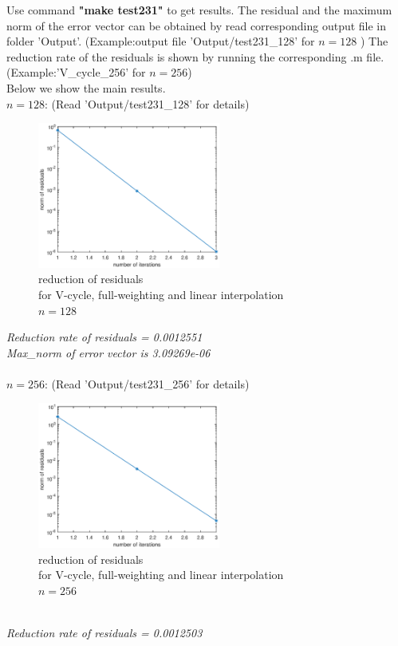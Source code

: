 \documentclass[a4paper,twocolumn]{article}
\theoremstyle{definition}
\begin{document}
Use command \textbf{"make test231"} to get results. The residual and the maximum norm of the error vector can be obtained by read corresponding output file in folder 'Output'. (Example:output file 'Output/test231\_128' for $n = 128$ ) The reduction rate of the residuals is shown by running the corresponding .m file. (Example:'V\_cycle\_256' for $n = 256$)\\
Below we show the main results.\\
$n=128$: (Read 'Output/test231\_128' for details)
\begin{figure}[!htp]   
	\centering
	\includegraphics[width=6cm]{Pictures/F231_1.eps}
	\caption{reduction of residuals \\for V-cycle, full-weighting and linear interpolation\\ $n = 128$}
\end{figure}
\newpage
\noindent \emph{Reduction rate of residuals = 0.0012551}\\
\emph{Max\_norm of error vector is 3.09269e-06}\\\\
$n=256$: (Read 'Output/test231\_256' for details)
\begin{figure}[!htp]   
	\centering
	\includegraphics[width=6cm]{Pictures/F231_2.eps}
	\caption{reduction of residuals \\for V-cycle, full-weighting and linear interpolation\\ $n = 256$}
\end{figure}\\
\noindent \emph{Reduction rate of residuals = 0.0012503}\\
\end{document}

